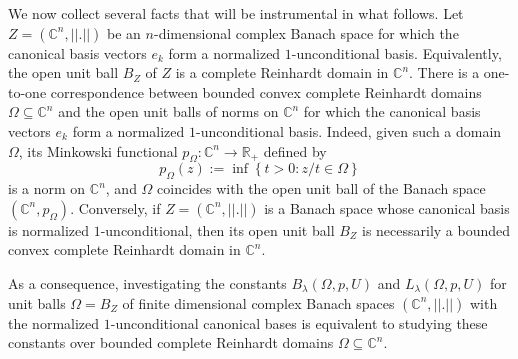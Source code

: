 \documentclass[a4paper,11pt, reqno]{amsart}
\theoremstyle{definition}
\begin{document}
	We now collect several facts that will be instrumental in what follows. Let $Z=(\mathbb{C}^n, ||.||)$ be an $n$-dimensional complex Banach space for which the canonical basis vectors $e_{k}$ form a normalized $1$-unconditional basis. Equivalently, the open unit ball $B_{Z}$ of $Z$ is a complete Reinhardt domain in $\mathbb{C}^n$. There is a one-to-one correspondence between bounded convex complete Reinhardt domains $\Omega \subseteq\mathbb{C}^n$ and the open unit balls of norms on $\mathbb{C}^n$ for which the canonical basis vectors $e_{k}$ form a normalized $1$-unconditional basis. Indeed, given such a domain $\Omega$, its Minkowski functional $p_{\Omega}:\mathbb{C}^n \rightarrow \mathbb{R}_{+}$ defined by $$p_{\Omega}(z):= \inf \left\{t>0 : z/t \in \Omega\right\}$$
	is a norm on $\mathbb{C}^n$, and $\Omega$ coincides with the open unit ball of the Banach space $(\mathbb{C}^n,p_{\Omega})$. Conversely, if $Z=(\mathbb{C}^n, ||.||)$ is a Banach space whose canonical basis is normalized $1$-unconditional, then its open unit ball $B_{	Z}$ is necessarily a bounded convex complete Reinhardt domain in $\mathbb{C}^n$. 
	\par
	As a consequence, investigating the constants $B_{\lambda}(\Omega, p,U)$ and $L_{\lambda}(\Omega, p,U)$ for unit balls $\Omega=B_{Z}$ of finite dimensional complex Banach spaces $(\mathbb{C}^n, ||.||)$ with the normalized $1$-unconditional canonical bases is equivalent to studying these constants over bounded complete Reinhardt domains $\Omega \subseteq\mathbb{C}^n$.
	\vspace{1mm}
	
\end{document}
